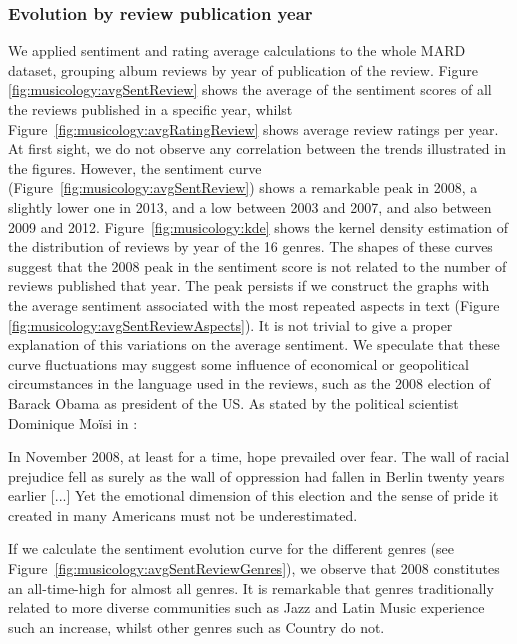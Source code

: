\subsubsection{Evolution by review publication year}
\label{sec:musicology:evolution-review}

We applied sentiment and rating average calculations to the whole MARD dataset, grouping album reviews by year of publication of the review. Figure \ref{fig:musicology:avgSentReview} shows the average of the sentiment scores of all the reviews published in a specific year, whilst Figure~\ref{fig:musicology:avgRatingReview} shows average review ratings per year. At first sight, we do not observe any correlation between the trends illustrated in the figures. However, the sentiment curve (Figure~\ref{fig:musicology:avgSentReview}) shows a remarkable peak in 2008, a slightly lower one in 2013, and a low between 2003 and 2007, and also between 2009 and 2012. Figure~\ref{fig:musicology:kde} shows the kernel density estimation of the distribution of reviews by year of the 16 genres. The shapes of these curves suggest that the 2008 peak in the sentiment score is not related to the number of reviews published that year. The peak persists if we construct the graphs with the average sentiment associated with the most repeated aspects in text (Figure \ref{fig:musicology:avgSentReviewAspects}). 
It is not trivial to give a proper explanation of this variations on the average sentiment. We speculate that these curve fluctuations may suggest some influence of economical or geopolitical circumstances in the language used in the reviews, such as the 2008 election of Barack Obama as president of the US. As stated by the political scientist Dominique Mo\"{i}si in \cite{Moisi2010}:

\begin{displayquote}\small{
In November 2008, at least for a time, hope prevailed over fear. The wall of racial prejudice fell as surely as the wall of oppression had fallen in Berlin twenty years earlier [...] Yet the emotional dimension of this election and the sense of pride it created in many Americans must not be underestimated.}
\end{displayquote}

If we calculate the sentiment evolution curve for the different genres (see Figure~\ref{fig:musicology:avgSentReviewGenres}), we observe that 2008 constitutes an all-time-high for almost all genres. It is remarkable that genres traditionally related to more diverse communities such as Jazz and Latin Music experience such an increase, whilst other genres such as Country do not.

